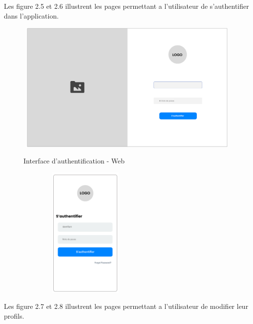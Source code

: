 \vspace{1cm}
Les figure 2.5 et 2.6 illustrent les  pages permettant a l'utilisateur de s'authentifier dans l'application.

\begin{figure}[h!]
  \centering
  \begin{minipage}[t]{0.60\textwidth}
    \centering
    \includegraphics[width=1\textwidth, height=6.5cm]{chap2.images/prot authentification.png}
    \caption{Interface d'authentification - Web}
  \end{minipage}
  \hfill
  \begin{minipage}[t]{0.38\textwidth}
    \centering
    \includegraphics[width=0.6\textwidth, height=6.5cm]{chap2.images/prot authentification mob.png}
    \caption{}
  \end{minipage}
\end{figure}


\newpage
Les figure 2.7 et 2.8 illustrent les  pages permettant a l'utilisateur de modifier leur profils.

